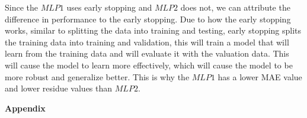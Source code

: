 \documentclass[12pt]{article}
\begin{document}
\begin{enumerate}[leftmargin=\labelsep,resume]
          Since the $MLP1$ uses early stopping and $MLP2$ does not, we can
          attribute the difference in performance to the early stopping.
          Due to how the early stopping works, similar to splitting the data
          into training and testing, early stopping splits the training data
          into training and validation, this will train a model that will
          learn from the training data and will evaluate it with the valuation data.
          This will cause the model to learn more effectively, which will cause
          the model to be more robust and generalize better.
          This is why the $MLP1$ has a lower MAE value and lower residue values than $MLP2$.

\end{enumerate}

\pagebreak

\center\large{\textbf{Appendix}\vskip 0.3cm}






\end{document}
